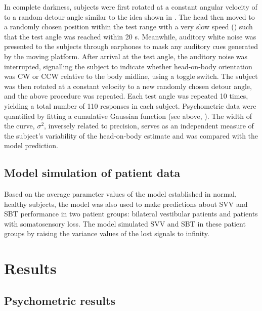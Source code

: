 In complete darkness, subjects were first rotated at a constant angular velocity of  to a random detour angle similar to the idea shown in . The head then moved to a randomly chosen position within the test range with a very slow speed () such that the test angle was reached within 20 \si{\second}. Meanwhile, auditory white noise was presented to the subjects through earphones to mask any auditory cues generated by the moving platform. After arrival at the test angle, the auditory noise was interrupted, signalling the subject to indicate whether head-on-body orientation was CW or CCW relative to the body midline, using a toggle switch. The subject was then rotated at a constant velocity to a new randomly chosen detour angle, and the above procedure was repeated. Each test angle was repeated 10 times, yielding a total number of 110 responses in each subject. Psychometric data were quantified by fitting a cumulative Gaussian function (see above, ). The width of the curve, $\sigma^2$, inversely related to precision, serves as an independent measure of the subject's variability of the head-on-body estimate and was compared with the model prediction.

\subsection{Model simulation of patient data}

Based on the average parameter values of the model established in normal, healthy subjects, the model was also used to make predictions about SVV and SBT performance in two patient groups: bilateral vestibular patients and patients with somatosensory loss. The model simulated SVV and SBT in these patient groups by raising the variance values of the lost signals to infinity.



\section{Results}

\subsection{Psychometric results}

